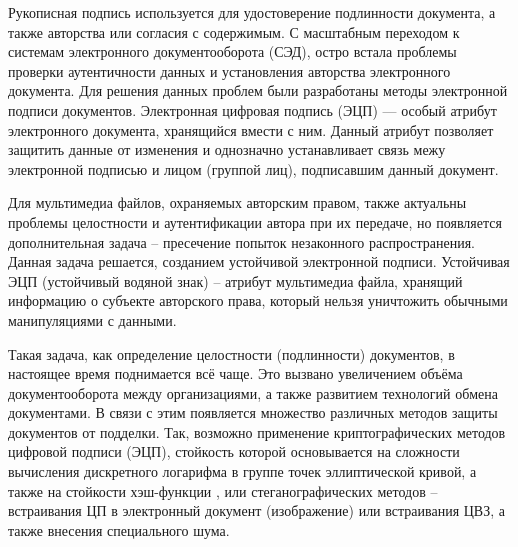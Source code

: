 \par \hspace{1.25cm}Рукописная подпись используется для удостоверение подлинности
 документа, а также авторства или согласия с содержимым. С масштабным переходом
  к системам электронного документооборота (СЭД), остро встала проблемы
   проверки аутентичности данных и установления авторства электронного
    документа. Для решения данных проблем были разработаны методы электронной подписи документов. Электронная цифровая подпись (ЭЦП) --- особый атрибут электронного документа, хранящийся вмести с ним. Данный атрибут позволяет защитить данные от изменения и однозначно устанавливает связь межу электронной подписью и лицом (группой лиц), подписавшим данный документ.
\par Для мультимедиа файлов, охраняемых авторским правом, также актуальны
 проблемы целостности и аутентификации автора при их передаче, но
  появляется дополнительная задача – пресечение попыток незаконного
   распространения. Данная задача решается, созданием устойчивой электронной
    подписи. Устойчивая ЭЦП (устойчивый водяной знак) -- атрибут мультимедиа файла, хранящий информацию о субъекте авторского права, который нельзя уничтожить обычными манипуляциями с данными. 
\par Такая задача, как определение целостности (подлинности) документов, в
 настоящее время поднимается всё чаще. Это вызвано увеличением объёма документооборота между организациями, а также развитием технологий обмена документами. В связи с этим появляется множество различных методов защиты документов от подделки. Так, возможно применение криптографических методов цифровой подписи (ЭЦП), стойкость которой основывается на сложности вычисления дискретного логарифма в группе точек эллиптической кривой, а также на стойкости хэш-функции \cite{gost34.10}, или стеганографических методов \cite{gupta2015} – встраивания ЦП в электронный документ (изображение) или встраивания ЦВЗ, а также внесения специального шума. 